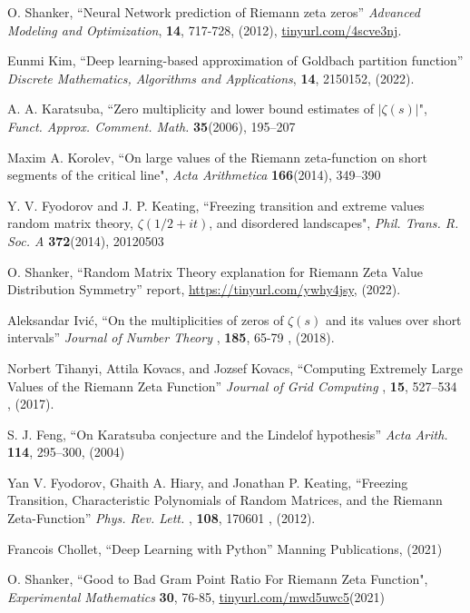 \documentclass[twoside]{article}
\begin{document}

\begin{thebibliography}{10}

 O. Shanker, ``Neural Network prediction of Riemann zeta zeros''
{\it Advanced Modeling and Optimization}, {\bf 14}, 717-728, (2012), \url{tinyurl.com/4scve3nj}.

 Eunmi Kim, ``Deep learning-based approximation of Goldbach partition function''
{\it  Discrete Mathematics, Algorithms and Applications}, {\bf 14}, 2150152, (2022). 

 A. A. Karatsuba, 
``Zero multiplicity and lower bound estimates of $|\zeta(s)|$",
{\it Funct.  Approx. Comment. Math.} {\bf35}(2006), 195–207

 Maxim A. Korolev, 
``On large values of the Riemann zeta-function on short segments of the critical line",
{\it Acta Arithmetica} {\bf166}(2014), 349–390

 Y. V. Fyodorov and J. P. Keating,
``Freezing transition and extreme values random matrix theory, $\zeta(1/2 + it)$, and disordered landscapes",
{\it Phil. Trans. R. Soc. A} {\bf372}(2014),  20120503

 O. Shanker, 
``Random Matrix Theory explanation for Riemann Zeta Value Distribution Symmetry''
 report,
\url{https://tinyurl.com/ywhy4jsy}, 
(2022). 

 Aleksandar Ivić, 
``On the multiplicities of zeros of $\zeta(s)$ and its values over short intervals''
{\it  Journal of Number Theory }, {\bf 185}, 65-79 , (2018). 

 Norbert Tihanyi, Attila Kovacs,  and Jozsef Kovacs, 
``Computing Extremely Large Values of the Riemann Zeta Function''
{\it  Journal of Grid Computing }, {\bf 15}, 527–534 , (2017). 

 S. J. Feng, ``On Karatsuba conjecture and the Lindelof hypothesis'' 
{\it  Acta Arith.} {\bf 114}, 295–300,  (2004)

Yan V. Fyodorov, Ghaith A. Hiary, and Jonathan P. Keating, 
``Freezing Transition, Characteristic Polynomials of Random Matrices, and the Riemann Zeta-Function''
{\it  Phys. Rev. Lett. }, {\bf 108}, 170601 , (2012). 

 Francois Chollet, ``Deep Learning with Python''
Manning Publications,  (2021)

 O. Shanker, 
``Good to Bad Gram Point Ratio For Riemann Zeta Function",
{\it Experimental Mathematics} {\bf 30}, 76-85,
\url{tinyurl.com/mwd5uwc5}(2021)


\end{thebibliography}
\end{document}
